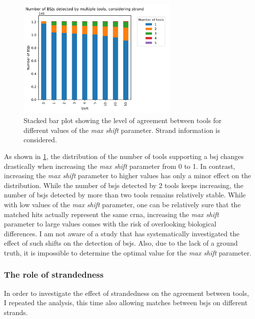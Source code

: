 \begin{figure}[H]
    \centering

    \includegraphics[width=0.7\textwidth]{chapters/4_results_and_discussion/figures/detection/shift_agreement_stranded.png}
    \caption{Stacked bar plot showing the level of agreement between tools for
        different values of the \textit{max shift} parameter.
        Strand information is considered.
    }
    \label{fig:shift_agreement_stranded}
\end{figure}

As shown in \cref{fig:shift_agreement_stranded}, the distribution of the number
of tools supporting a \gls{bsj} changes drastically when increasing the
\textit{max shift} parameter from 0 to 1.
In contrast, increasing the \textit{max shift} parameter to higher values has
only a minor effect on the distribution.
While the number of \glspl{bsj} detected by 2 tools keeps increasing, the
number of \glspl{bsj} detected by more than two tools remains relatively
stable.
While with low values of the \textit{max shift} parameter, one can be
relatively sure that the matched hits actually represent the same \gls{crna},
increasing the \textit{max shift} parameter to large values comes with the risk
of overlooking biological differences.
I am not aware of a study that has systematically investigated the effect of
such shifts on the detection of \glspl{bsj}.
Also, due to the lack of a ground truth, it is impossible to determine the
optimal value for the \textit{max shift} parameter.

\subsubsection{The role of strandedness}

In order to investigate the effect of strandedness on the agreement between
tools, I repeated the analysis, this time also allowing matches between
\glspl{bsj} on different strands.

